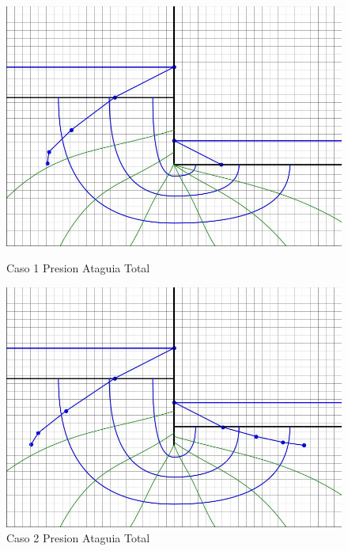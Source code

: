 \begin{figure}[H]
    \centering
    \begin{minipage}{0.32\textwidth}
        \centering
        \includegraphics[width=\textwidth]{GRAFICOS/caso_1_presion_ataguia_total.jpg}
        \caption{Caso 1 Presion Ataguia Total}
    \end{minipage}
    \begin{minipage}{0.32\textwidth}
        \centering
        \includegraphics[width=\textwidth]{GRAFICOS/caso_2_presion_ataguia_total.jpg}
        \caption{Caso 2 Presion Ataguia Total}
    \end{minipage}
    \begin{minipage}{0.32\textwidth}
        \centering

\end{minipage}
\end{figure}
